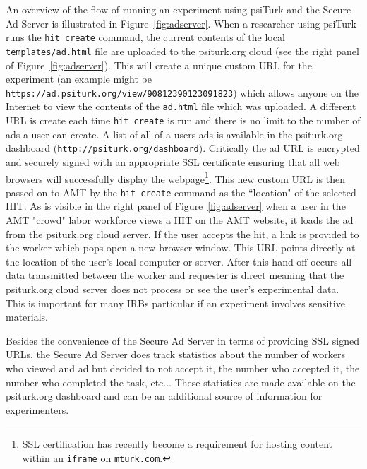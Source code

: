 \documentclass[twocolumn]{svjour3}          %
\begin{document}
An overview of the flow of running an experiment using
\textsf{psiTurk} and the Secure Ad Server is illustrated in
Figure~\ref{fig:adserver}.  When a researcher using \textsf{psiTurk}
runs the \texttt{hit create} command, the current contents of the local
\texttt{templates/ad.html} file are uploaded to the psiturk.org cloud (see
the right panel of Figure~\ref{fig:adserver}).
This will create a unique custom URL for the experiment (an example might be
\texttt{https://ad.psiturk.org/view/90812390123091823}) which
allows anyone on the Internet to view the contents of the \texttt{ad.html}
file which was uploaded.  A different URL is create each time \texttt{hit create}
is run and there is no limit to the number of ads a user can create.  A list
of all of a users ads is available in the psiturk.org dashboard (\texttt{http://psiturk.org/dashboard}).
Critically the ad URL is encrypted and
securely signed with an appropriate SSL certificate ensuring that all
web browsers will successfully display the webpage\footnote{SSL certification has recently become a requirement for hosting content within an \texttt{iframe} on \texttt{mturk.com}.}.  This new custom URL is then passed
on to AMT by the \texttt{hit create} command as the ``location" of
the selected HIT.  As is visible in the right panel of Figure~\ref{fig:adserver}
when a user in the AMT "crowd" labor workforce views a HIT on the AMT
website, it loads the ad from the psiturk.org cloud server.  If the user accepts
the hit, a link is provided to the worker which pops open a new browser
window.  This URL points directly at the location of the user's local computer
or server.  After this hand off occurs all data transmitted between the worker
and requester is direct meaning that the psiturk.org cloud server does not
process or see the user's experimental data.  This is important for many IRBs
particular if an experiment involves sensitive materials.

Besides the convenience of the Secure Ad Server in terms of providing
SSL signed URLs, the Secure Ad Server does track statistics about the
number of workers who viewed and ad but decided to not accept it, the
number who accepted it, the number who completed the task, etc...
These statistics are made available on the psiturk.org dashboard
and can be an additional source of information for experimenters.


%
%
\end{document}
